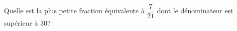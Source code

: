 %
%
Quelle est la plus petite fraction équivalente à $\dfrac{7}{21}$ dont le dénominateur est supérieur à $30$?
